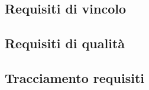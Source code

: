 {\begin{longtable}{ l p{7cm} l p{3cm}}
            
            
        \end{longtable}
        
    }


\subsection{Requisiti di vincolo}
\subsection{Requisiti di qualità}

\subsection{Tracciamento requisiti}
